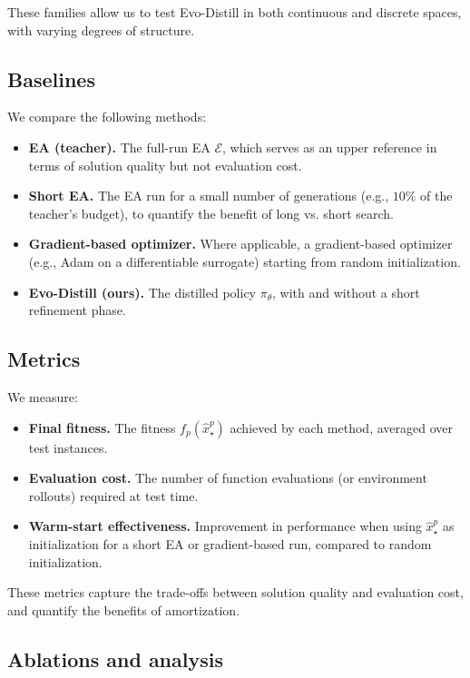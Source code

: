 \documentclass{article}
\begin{document}
These families allow us to test Evo-Distill in both continuous and discrete spaces, with varying degrees of structure.

\subsection{Baselines}

We compare the following methods:
\begin{itemize}
    \item \textbf{EA (teacher).} The full-run EA $\mathcal{E}$, which serves as an upper reference in terms of solution quality but not evaluation cost.
    \item \textbf{Short EA.} The EA run for a small number of generations (e.g., $10\%$ of the teacher's budget), to quantify the benefit of long vs. short search.
    \item \textbf{Gradient-based optimizer.} Where applicable, a gradient-based optimizer (e.g., Adam on a differentiable surrogate) starting from random initialization.
    \item \textbf{Evo-Distill (ours).} The distilled policy $\pi_\theta$, with and without a short refinement phase.
\end{itemize}

\subsection{Metrics}

We measure:
\begin{itemize}
    \item \textbf{Final fitness.} The fitness $f_p(\hat{x}_\star^p)$ achieved by each method, averaged over test instances.
    \item \textbf{Evaluation cost.} The number of function evaluations (or environment rollouts) required at test time.
    \item \textbf{Warm-start effectiveness.} Improvement in performance when using $\hat{x}_\star^p$ as initialization for a short EA or gradient-based run, compared to random initialization.
\end{itemize}

These metrics capture the trade-offs between solution quality and evaluation cost, and quantify the benefits of amortization.

\subsection{Ablations and analysis}
\end{document}
